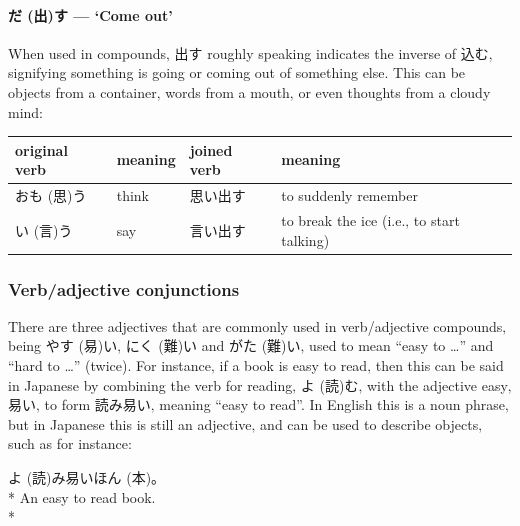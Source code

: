 \documentclass[11pt, b5paper, twoside, openright, onecolumn]{book}
\makeatletter
\newcommand*{\rtrubystack}[2]{{\relscale{0.5}%
  \begin{tabular}[b]{@{}c@{}}%
    {#1}\\%
    {\textscale{2}{#2}}%
  \end{tabular}}%
}
\DeclareRobustCommand*{\rtruby}[2]{%
  \mbox{%
    \setlength{\parskip}{0ex}%
    \BeginAccSupp{method=pdfstringdef,ActualText={#1}}%
      \rtrubystack{\phantom{#2}}{#1}%
      \llap{%
        \rtrubystack{#2}{\phantom{#1}}%
      }%
    \EndAccSupp{}%
  }%
}
\newcommand*{\rubystack}[2]{{\relscale{0.5}%
  \begin{tabular}[b]{@{}c@{}}%
    {#1}\\%
   {\textscale{2}{#2}}%
  \end{tabular}}%
}
\DeclareRobustCommand*{\ruby}[2]{%
  \mbox{%
    \setlength{\parskip}{0ex}%
    \BeginAccSupp{method=pdfstringdef,ActualText={#1}}%
      \rubystack{\phantom{#2}}{#1}%
      \llap{%
        \rubystack{#2}{\phantom{#1}}%
      }%
    \EndAccSupp{}%
  }%
}
\renewcommand*{\rtruby}[2]{#2 (#1)}%
\renewcommand*{\ruby}[2]{#2 (#1)}%
\newenvironment{exampleblock}{
\setlength{\parindent}{0.6in}
\begin{minipage}[t]{\dimexpr\textwidth-\parindent}}
{\end{minipage}}
\newenvironment{mytabularcentered}[1]{\noindent
\begin{center}\begin{tabular}[h]{#1}}{\end{tabular}\end{center}}
\makeatother
\begin{document}
\paragraph{\ruby{出}{だ}す — ‘Come out’}

When used in compounds‚ 出す roughly speaking indicates the inverse of 込む‚ signifying something is going or coming out of something else. This can be objects from a container‚ words from a mouth‚ or even thoughts from a cloudy mind:

\vspace{0.5cm}
\smaller
\begin{center}
\begin{mytabularcentered}{| l  l  l  l |}\hline 
\rule{0pt}{2.4ex}original verb & meaning & joined verb & meaning\\ 
\hline
\rule{0pt}{3.6ex}\rtruby{思}{おも}う & think & 思い出す & to suddenly remember\\ 
\rule{0pt}{3.6ex}\rtruby{言}{い}う & say & 言い出す & to break the ice (i.e.‚ to start talking)\\ 
\hline 
\end{mytabularcentered}
\end{center}
\larger
\subsubsection{Verb/adjective conjunctions}


There are three adjectives that are commonly used in verb/adjective compounds‚ being \ruby{易}{やす}い‚ \ruby{難}{にく}い and \ruby{難}{がた}い‚ used to mean “easy to …” and “hard to …” (twice). For instance‚ if a book is easy to read‚ then this can be said in Japanese by combining the verb for reading‚ \ruby{読}{よ}む‚ with the adjective easy‚ 易い‚ to form 読み易い‚ meaning “easy to read”. In English this is a noun phrase‚ but in Japanese this is still an adjective‚ and can be used to describe objects‚ such as for instance:

\vspace{0.4cm}
\begin{exampleblock}
\ruby{読}{よ}み易い\ruby{本}{ほん}。 \\* 
An easy to read book. \\* 
\end{exampleblock}
\vspace{0.2cm}
\end{document}
